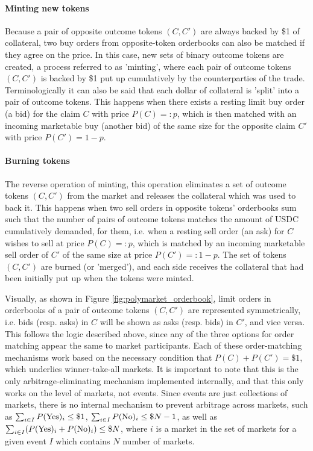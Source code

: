 \paragraph{Minting new tokens} Because a pair of opposite outcome tokens $(C, C')$ are always backed by \$1 of collateral,
two buy orders from opposite-token orderbooks can also be matched if they agree on the price.
In this case, new sets of binary outcome tokens are created, a process referred to as 'minting', where each pair of outcome tokens $(C, C')$ is backed by \$1 put up cumulatively by the counterparties of the trade.
Terminologically it can also be said that each dollar of collateral is 'split' into a pair of outcome tokens.
This happens when there exists a resting limit buy order (a bid) for the claim $C$ with price $P(C) =: p$, which is then matched with an incoming marketable buy (another bid) of the same size for the opposite claim $C'$ with price $P(C') = 1 - p$.

\paragraph{Burning tokens} The reverse operation of minting, this operation eliminates a set of outcome tokens $(C, C')$ from the market and releases the collateral which was used to back it.
This happens when two sell orders in opposite tokens' orderbooks sum such that the number of pairs of outcome tokens matches the amount of USDC cumulatively demanded, for them, i.e. when a resting sell order (an ask) for $C$ wishes to sell at price $P(C) =: p$, which is matched by an incoming marketable sell order of $C'$ of the same size at price $P(C') =: 1 - p$.
The set of tokens $(C, C')$ are burned (or 'merged'), and each side receives the collateral that had been initially put up when the tokens were minted.

Visually, as shown in Figure \ref{fig:polymarket_orderbook}, limit orders in orderbooks of a pair of outcome tokens $(C, C')$ are represented symmetrically, i.e. bids (resp. asks) in $C$ will be shown as asks (resp. bids) in $C'$, and vice versa. This follows the logic described above, since any of the three options for order matching appear the same to market participants.
Each of these order-matching mechanisms work based on the necessary condition that $P(C) + P(C') = \$1$, which underlies winner-take-all markets.
It is important to note that this is the only arbitrage-eliminating mechanism implemented internally, and that this only works on the level of markets, not events.
Since events are just collections of markets, there is no internal mechanism to prevent arbitrage across markets, such as
$\sum_{i \in I} P(\text{Yes})_{i} \le \$1$, $\sum_{i \in I} P(\text{No})_{i} \le \$N - 1$, as well as $\sum_{i \in I} (P(\text{Yes})_{i} + P(\text{No})_{i}) \le \$N$,
where $i$ is a market in the set of markets for a given event $I$ which contains $N$ number of markets.
\citep{PMDocs, saguillo_unravelling_2025}

